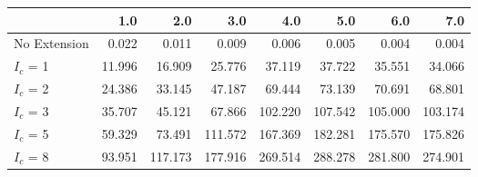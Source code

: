 \begin{tabular}{lrrrrrrr}
\toprule
{} &    1.0 &     2.0 &     3.0 &     4.0 &     5.0 &     6.0 &     7.0 \\
\midrule
No Extension &  0.022 &   0.011 &   0.009 &   0.006 &   0.005 &   0.004 &   0.004 \\
$I_c$ = 1    & 11.996 &  16.909 &  25.776 &  37.119 &  37.722 &  35.551 &  34.066 \\
$I_c$ = 2    & 24.386 &  33.145 &  47.187 &  69.444 &  73.139 &  70.691 &  68.801 \\
$I_c$ = 3    & 35.707 &  45.121 &  67.866 & 102.220 & 107.542 & 105.000 & 103.174 \\
$I_c$ = 5    & 59.329 &  73.491 & 111.572 & 167.369 & 182.281 & 175.570 & 175.826 \\
$I_c$ = 8    & 93.951 & 117.173 & 177.916 & 269.514 & 288.278 & 281.800 & 274.901 \\
\bottomrule
\end{tabular}
